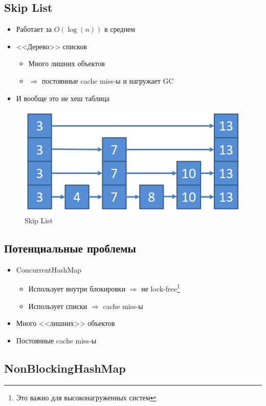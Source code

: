 \documentclass[10pt,a4paper,oneside,titlepage]{article}
\theoremstyle{plain}
\theoremstyle{defenition}
\begin{document}
\subsection{Skip List}

\begin{itemize}
	\item Работает за $O(\log(n))$ в среднем
	\item <<Дерево>> списков
	\begin{itemize}
		\item Много лишних объектов
		\item $\Rightarrow$ постоянные cache miss-ы и нагружает GC 
	\end{itemize}
    \item И вообще это не хеш таблица
\end{itemize}

\begin{figure}[h!]
	\centering
	\includegraphics[width=0.4\linewidth]{pictures/SkipList}
	\caption{Skip List}
	\label{fig:skiplist}
\end{figure}

\subsection{Потенциальные проблемы}
\begin{itemize}
	\item ConcurrentHashMap
	\begin{itemize}
		\item Использует внутри блокировки $\Rightarrow$ не lock-free\footnote{Это важно для высоконагруженных систем}
		\item Использует списки $\Rightarrow$ cache miss-ы
	\end{itemize}
    \item Много <<лишних>> объектов
    \item Постоянные cache miss-ы
\end{itemize}

\subsection{NonBlockingHashMap}
\end{document}

